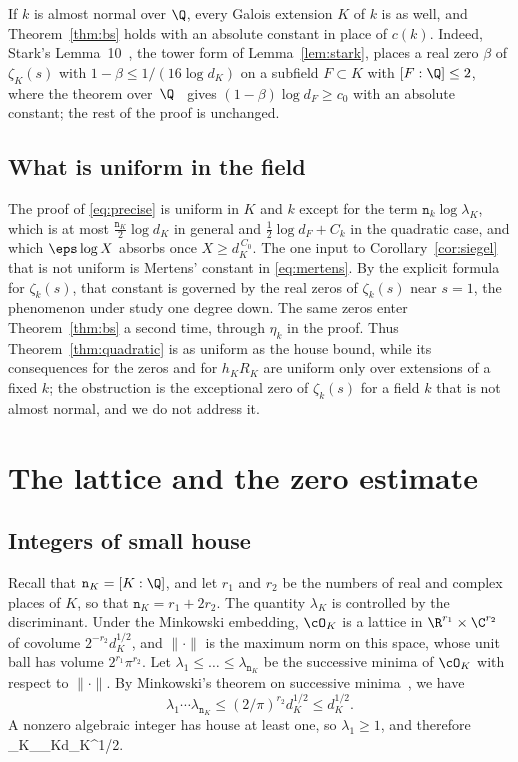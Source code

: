 \documentclass[11pt, reqno, twoside, letterpaper]{amsart}
\newcommand{\house}[1]{\lVert #1\rVert}
\newcommand{\dk}{{\mathtt{n}_k}}
\newcommand{\dK}{{\mathtt{n}_K}}
\newcommand{\expC}{C}
\newcommand{\XX}{X}
\newcommand{\lam}{\lambda}
\newcommand{\lamK}{\lambda_{\Kf}}
\newcommand{\Kf}{K}
\begin{document}
\begin{remark}\label{rem:almost}
If $k$ is almost normal over $\Q$, every Galois extension
$\Kf$ of $k$ is as well, and Theorem~\ref{thm:bs} holds with an
absolute
constant in place of $c(k)$. Indeed, Stark's Lemma~10~\cite{St}, the
tower form of Lemma~\ref{lem:stark}, places a real zero $\beta$ of
$\zeta_\Kf(s)$ with $1-\beta\le 1/(16\log d_\Kf)$ on a subfield
$F\subset\Kf$ with $[F:\Q]\le 2$, where the theorem
over~$\Q$~\cite{OAI,Gr,Ko} gives $(1-\beta)\log d_F\ge c_0$ with an
absolute constant; the rest of the proof is unchanged.
\end{remark}

\subsection{What is uniform in the field}\label{sec:uniform}

The proof of \eqref{eq:precise} is uniform in $\Kf$ and $k$ except
for the term $\dk\log\lamK$, which is at most
$\frac{\dK}{2}\log d_\Kf$ in general and $\frac12\log d_F+C_k$ in the
quadratic case, and which $\eps\log\XX$ absorbs once
$\XX\ge d_\Kf^{\,\expC_0}$. The one input to
Corollary~\ref{cor:siegel} that is not uniform is Mertens' constant
in \eqref{eq:mertens}. By
the explicit formula for $\zeta_k(s)$, that constant is governed by
the real zeros of $\zeta_k(s)$ near $s=1$, the phenomenon under study
one degree down. The same zeros enter Theorem~\ref{thm:bs} a
second time, through $\eta_k$ in the proof. Thus
Theorem~\ref{thm:quadratic} is as uniform as the house bound, while
its consequences for the zeros and for $h_\Kf R_\Kf$ are uniform
only over extensions of a fixed $k$; the obstruction is the
exceptional zero of $\zeta_k(s)$ for a field $k$ that is not almost
normal, and we do not address it.

\section{The lattice and the zero estimate}\label{sec:lattice}

\subsection{Integers of small house}

Recall that $\dK=[\Kf:\Q]$, and let $r_1$ and $r_2$ be the numbers of
real and complex places of $\Kf$, so that $\dK=r_1+2r_2$. The quantity
$\lamK$ is controlled by the discriminant. Under the Minkowski
embedding, $\cO_\Kf$ is a lattice in $\R^{r_1}\times\C^{r_2}$ of
covolume $2^{-r_2}d_\Kf^{1/2}$, and $\house{\cdot}$ is the maximum
norm on this space, whose unit ball has volume $2^{r_1}\pi^{r_2}$. Let
$\lam_1\le\dots\le\lam_\dK$ be the successive minima of $\cO_\Kf$ with
respect to $\house{\cdot}$. By Minkowski's theorem on successive
minima~\cite[Chapter~VIII, Theorem~V]{Ca}, we have
\[
\lam_1\cdots\lam_\dK\le(2/\pi)^{r_2}d_\Kf^{1/2}\le d_\Kf^{1/2}.
\]
A nonzero algebraic integer has house at least one, so $\lam_1\ge 1$,
and therefore
\be\label{eq:minkowski}
\lamK\le\lam_\dK\le d_\Kf^{1/2}.
\ee
\end{document}
